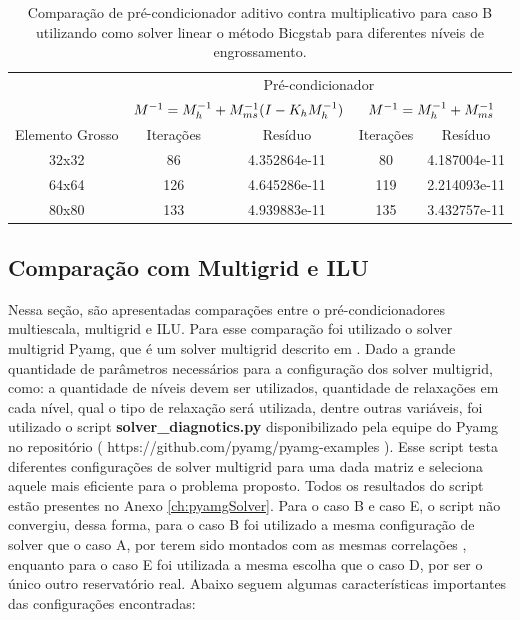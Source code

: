 \begin{table}[]
    \caption{Comparação de pré-condicionador aditivo contra multiplicativo para caso B utilizando como solver linear o método Bicgstab para diferentes níveis de engrossamento.}
    \label{table:precondcasoBcomp}
    \begin{tabular}{c|c|c|c|l|}
    \cline{2-5}
                                          & \multicolumn{4}{c|}{Pré-condicionador}                                                        \\ \cline{2-5} 
                                          & \multicolumn{2}{c|}{$M^{-1}=M^{-1}_{h} + M^{-1}_{ms}(I-K_hM^{-1}_{h})$}               & \multicolumn{2}{c|}{$M^{-1}=M^{-1}_{h} + M^{-1}_{ms}$}                \\ \hline
    \multicolumn{1}{|c|}{Elemento Grosso} & Iterações & \multicolumn{1}{c|}{Resíduo}      & Iterações & \multicolumn{1}{c|}{Resíduo}      \\ \hline
    \multicolumn{1}{|c|}{32x32}           & 86        & \multicolumn{1}{c|}{4.352864e-11} & 80        & \multicolumn{1}{c|}{4.187004e-11} \\ \hline
    \multicolumn{1}{|c|}{64x64}           & 126       & 4.645286e-11                      & 119       & 2.214093e-11                      \\ \hline
    \multicolumn{1}{|c|}{80x80}           & 133       & 4.939883e-11                      & 135       & 3.432757e-11                      \\ \hline
    \end{tabular}
\end{table}


\subsection{Comparação com Multigrid e ILU}

Nessa seção, são apresentadas comparações entre o pré-condicionadores multiescala, multigrid e ILU. Para esse comparação foi utilizado o solver multigrid Pyamg, que é um solver multigrid  descrito em \cite{OlSc2018}. Dado a grande quantidade de parâmetros necessários para a configuração dos solver multigrid, como: a quantidade de níveis devem ser utilizados, quantidade de relaxações em cada nível, qual o tipo de relaxação será utilizada, dentre outras variáveis, foi utilizado o script \textbf{solver\_diagnotics.py} disponibilizado pela equipe do Pyamg no repositório ( https://github.com/pyamg/pyamg-examples ). Esse script testa diferentes configurações de solver multigrid para uma dada matriz e seleciona aquele mais eficiente para o problema proposto. Todos os resultados do script estão presentes no Anexo \ref{ch:pyamgSolver}. Para o caso B e caso E, o script não convergiu, dessa forma, para o caso B foi utilizado a mesma configuração de solver que o caso A, por terem sido montados com as mesmas correlações , enquanto para o caso E foi utilizada a mesma escolha que o caso D, por ser o único outro reservatório real. Abaixo seguem algumas características importantes das configurações encontradas:


